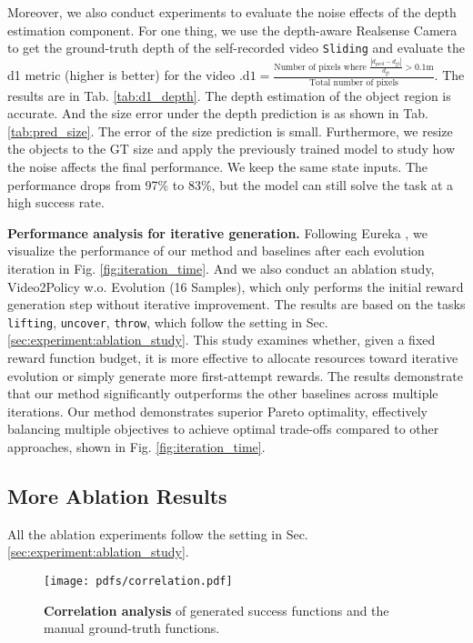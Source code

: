 Moreover, we also conduct experiments to evaluate the noise effects of the depth estimation component. For one thing, we use the depth-aware Realsense Camera to get the ground-truth depth of the self-recorded video \texttt{Sliding} and evaluate the d1 metric (higher is better) for the video \citep{piccinelli2024unidepth}.$\text{d1} = \frac{\text{Number of pixels where } \frac{|d_{\text{pred}} - d_{\text{gt}}|}{d_{\text{gt}}} > \text{0.1m}}{\text{Total number of pixels}}$. The results are in Tab. \ref{tab:d1_depth}. The depth estimation of the object region is accurate. And the size error under the depth prediction is as shown in Tab. \ref{tab:pred_size}. The error of the size prediction is small. Furthermore, we resize the objects to the GT size and apply the previously trained model to study how the noise affects the final performance. We keep the same state inputs. The performance drops from 97\% to 83\%, but the model can still solve the task at a high success rate.

\textbf{Performance analysis for iterative generation.} Following Eureka \citep{ma2023eureka}, we visualize the performance of our method and baselines after each evolution iteration in Fig. \ref{fig:iteration_time}. And we also conduct an ablation study, Video2Policy w.o. Evolution (16 Samples), which only performs the initial reward generation step without iterative improvement. The results are based on the tasks \texttt{lifting}, \texttt{uncover}, \texttt{throw}, which follow the setting in Sec. \ref{sec:experiment:ablation_study}. This study examines whether, given a fixed reward function budget, it is more effective to allocate resources toward iterative evolution or simply generate more first-attempt rewards. The results demonstrate that our method significantly outperforms the other baselines across multiple iterations. Our method demonstrates superior Pareto optimality, effectively balancing multiple objectives to achieve optimal trade-offs compared to other approaches, shown in Fig. \ref{fig:iteration_time}.

\subsection{More Ablation Results}
\label{app:more_ablation}
All the ablation experiments follow the setting in Sec. \ref{sec:experiment:ablation_study}.

\begin{figure}
    \centering
    \texttt{[image: pdfs/correlation.pdf]}
    \caption{
  \textbf{Correlation analysis} of generated success functions and the manual ground-truth functions.}
    \label{fig:correlation}
\end{figure}

